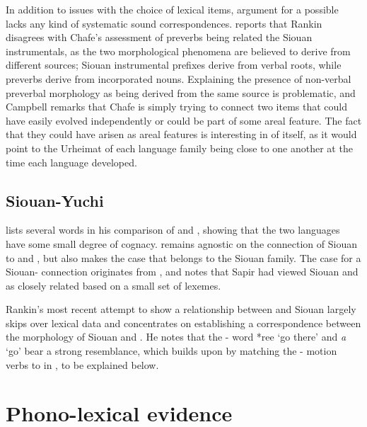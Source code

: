 \documentclass[output=paper]{LSP/langsci}
\begin{document}
In addition to issues with the choice of lexical items,  argument for a possible  lacks any kind of systematic sound correspondences. \citet{Campbell2000} reports that Rankin disagrees with Chafe's assessment of  preverbs being related the Siouan instrumentals, as the two morphological phenomena are believed to derive from different sources; Siouan instrumental prefixes derive from verbal roots, while  preverbs derive from incorporated nouns. Explaining the presence of non-verbal preverbal morphology as being derived from the same source is problematic, and Campbell remarks that Chafe is simply trying to connect two items that could have easily evolved independently or could be part of some areal feature. The fact that they could have arisen as areal features is interesting in of itself, as it would point to the Urheimat of each language family being close to one another at the time each language developed.

\subsection{Siouan-Yuchi}

\citet{Carter1980} lists several  words in his comparison of  and , showing that the two languages have some small degree of cognacy. \citet{Rankin1996,Rankin1998scy} remains agnostic on the connection of Siouan to  and , but also makes the case that  belongs to the Siouan family. The case for a Siouan- connection originates from \citet{Sapir1929}, and \citet{Haas1952} notes that Sapir had viewed Siouan and  as closely related based on a small set of lexemes.

Rankin's \citeyear{Rankin1998scy} most recent attempt to show a relationship between  and Siouan largely skips over lexical data and concentrates on establishing a correspondence between the morphology of Siouan and . He notes that the - word *ree `go there' and  \emph{\textbeltl a} `go' bear a strong resemblance, which \citet{Kasak2012,Kasak2013} builds upon by matching the - motion verbs to  in , to be explained below.

\section{Phono-lexical evidence}\label{sec:kasak:4}
\end{document}
